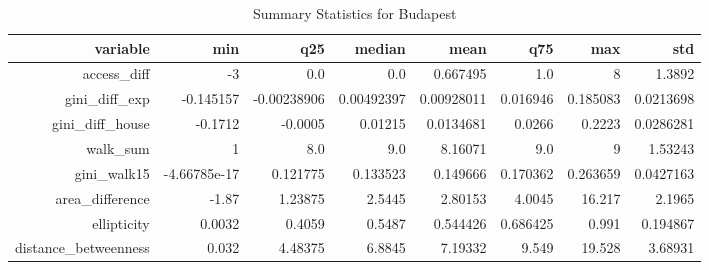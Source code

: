\begin{table}
  \caption{Summary Statistics for Budapest}
  \begin{tabular}{rrrrrrrr}
    \hline
    \textbf{variable} & \textbf{min} & \textbf{q25} & \textbf{median} & \textbf{mean} & \textbf{q75} & \textbf{max} & \textbf{std} \\\hline
    access\_diff & -3 & 0.0 & 0.0 & 0.667495 & 1.0 & 8 & 1.3892 \\
    gini\_diff\_exp & -0.145157 & -0.00238906 & 0.00492397 & 0.00928011 & 0.016946 & 0.185083 & 0.0213698 \\
    gini\_diff\_house & -0.1712 & -0.0005 & 0.01215 & 0.0134681 & 0.0266 & 0.2223 & 0.0286281 \\
    walk\_sum & 1 & 8.0 & 9.0 & 8.16071 & 9.0 & 9 & 1.53243 \\
    gini\_walk15 & -4.66785e-17 & 0.121775 & 0.133523 & 0.149666 & 0.170362 & 0.263659 & 0.0427163 \\
    area\_difference & -1.87 & 1.23875 & 2.5445 & 2.80153 & 4.0045 & 16.217 & 2.1965 \\
    ellipticity & 0.0032 & 0.4059 & 0.5487 & 0.544426 & 0.686425 & 0.991 & 0.194867 \\
    distance\_betweenness & 0.032 & 4.48375 & 6.8845 & 7.19332 & 9.549 & 19.528 & 3.68931 \\\hline
  \end{tabular}
  \label{tab:budapest_stats}
\end{table}
